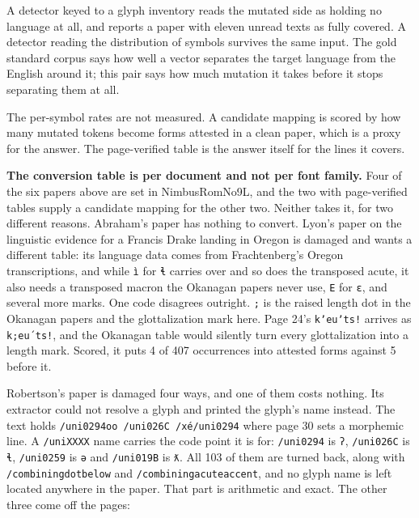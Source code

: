 A detector keyed to a glyph inventory reads the mutated side as holding no language at all, and reports a paper with eleven unread texts as fully covered. A detector reading the distribution of symbols survives the same input. The gold standard corpus says how well a vector separates the target language from the English around it; this pair says how much mutation it takes before it stops separating them at all.

The per-symbol rates are not measured. A candidate mapping is scored by how many mutated tokens become forms attested in a clean paper, which is a proxy for the answer. The page-verified table is the answer itself for the lines it covers.

\textbf{The conversion table is per document and not per font family.} Four of the six papers above are set in NimbusRomNo9L, and the two with page-verified tables supply a candidate mapping for the other two. Neither takes it, for two different reasons. Abraham's paper has nothing to convert. Lyon's paper on the linguistic evidence for a Francis Drake landing in Oregon \cite{src:Lyon-2014} is damaged and wants a different table: its language data comes from Frachtenberg's Oregon transcriptions, and while \texttt{ì} for \texttt{ɬ} carries over and so does the transposed acute, it also needs a transposed macron the Okanagan papers never use, \texttt{E} for \texttt{ɛ}, and several more marks. One code disagrees outright. \texttt{;} is the raised length dot in the Okanagan papers and the glottalization mark here. Page 24's \texttt{kʼeuʼts!} arrives as \texttt{k;eu´ts!}, and the Okanagan table would silently turn every glottalization into a length mark. Scored, it puts 4 of 407 occurrences into attested forms against 5 before it.

Robertson's paper \cite{src:Robertson-2012} is damaged four ways, and one of them costs nothing. Its extractor could not resolve a glyph and printed the glyph's name instead. The text holds \texttt{/uni0294oo /uni026C /xé/uni0294} where page 30 sets a morphemic line. A \texttt{/uniXXXX} name carries the code point it is for: \texttt{/uni0294} is \texttt{ʔ}, \texttt{/uni026C} is \texttt{ɬ}, \texttt{/uni0259} is \texttt{ə} and \texttt{/uni019B} is \texttt{ƛ}. All 103 of them are turned back, along with \texttt{/combiningdotbelow} and \texttt{/combiningacuteaccent}, and no glyph name is left located anywhere in the paper. That part is arithmetic and exact. The other three come off the pages:

